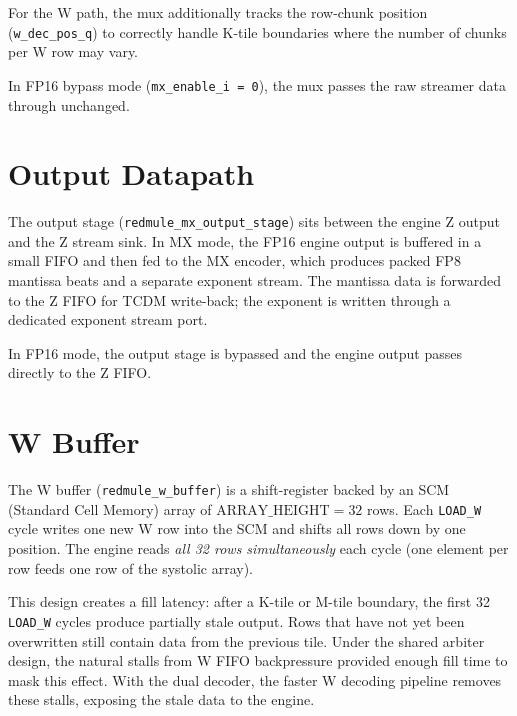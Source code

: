 For the W path, the mux additionally tracks the row-chunk position
(\texttt{w\_dec\_pos\_q}) to correctly handle K-tile boundaries where the number
of chunks per W row may vary.

In FP16 bypass mode (\texttt{mx\_enable\_i = 0}), the mux passes the raw
streamer data through unchanged.


\section{Output Datapath}
\label{sec:mx-output-datapath}

The output stage (\texttt{redmule\_mx\_output\_stage}) sits between the engine
Z output and the Z stream sink. In MX mode, the FP16 engine output is buffered
in a small FIFO and then fed to the MX encoder, which produces packed FP8
mantissa beats and a separate exponent stream. The mantissa data is forwarded to
the Z FIFO for TCDM write-back; the exponent is written through a dedicated
exponent stream port.

In FP16 mode, the output stage is bypassed and the engine output passes directly
to the Z FIFO.



\section{W Buffer}
\label{sec:w-buffer-scm}

The W buffer (\texttt{redmule\_w\_buffer}) is a shift-register backed by an SCM
(Standard Cell Memory) array of $\text{ARRAY\_HEIGHT} = 32$ rows. Each
\texttt{LOAD\_W} cycle writes one new W row into the SCM and shifts all rows
down by one position. The engine reads \emph{all 32 rows simultaneously} each
cycle (one element per row feeds one row of the systolic array).

This design creates a fill latency: after a K-tile or M-tile boundary, the
first 32 \texttt{LOAD\_W} cycles produce partially stale output. Rows that have
not yet been overwritten still contain data from the previous tile. Under the
shared arbiter design, the natural stalls from W FIFO backpressure provided
enough fill time to mask this effect. With the dual decoder, the faster W
decoding pipeline removes these stalls, exposing the stale data to the engine.

